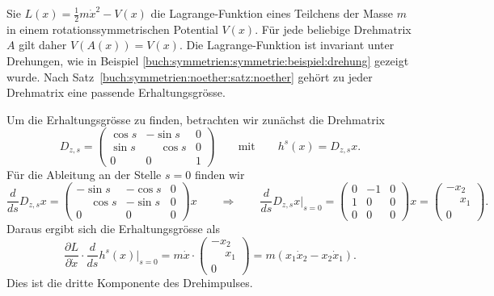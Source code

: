 \begin{beispiel}
\label{buch:symmetrien:noether:beispiel:drehimpuls}
Sie $L(x) = \frac12m\dot{x}^2 - V(x)$ die Lagrange-Funktion eines Teilchens
der Masse $m$ in einem rotationssymmetrischen Potential $V(x)$.
Für jede beliebige Drehmatrix $A$ gilt daher $V(A(x))=V(x)$.
Die Lagrange-Funktion ist invariant unter Drehungen, wie in Beispiel
\ref{buch:symmetrien:symmetrie:beispiel:drehung} gezeigt wurde.
Nach Satz~\ref{buch:symmetrien:noether:satz:noether} gehört zu jeder 
Drehmatrix eine passende Erhaltungsgrösse.

Um die Erhaltungsgrösse zu finden, betrachten wir zunächst die Drehmatrix
\[
D_{z,s}
=
\begin{pmatrix}
\cos s &          - \sin s & 0 \\
\sin s & \phantom{-}\cos s & 0 \\
   0   &            0      & 1
\end{pmatrix}
\qquad\text{mit}\qquad
h^s(x)
=
D_{z,s}x.
\]
Für die Ableitung an der Stelle $s=0$ finden wir
\[
\frac{d}{ds} D_{z,s}x
=
\begin{pmatrix}
          -\sin s & -\cos s & 0 \\
\phantom{-}\cos s & -\sin s & 0 \\
        0         &    0    & 0
\end{pmatrix}
x
\qquad\Rightarrow\qquad
\frac{d}{ds} D_{z,s}x
\bigg|_{s=0}
=
\begin{pmatrix}
 0 & -1 & 0 \\
 1 &  0 & 0 \\
 0 &  0 & 0
\end{pmatrix}
x
=
\begin{pmatrix}
-x_2\\
\phantom{-}x_1\\
0
\end{pmatrix}.
\]
Daraus ergibt sich die Erhaltungsgrösse als
\[
\frac{\partial L}{\partial\dot{x}}
\cdot
\frac{d}{ds}h^s(x)\bigg|_{s=0}
=
m\dot{x}\cdot
\begin{pmatrix}
-x_2\\
\phantom{-}x_1\\
0
\end{pmatrix}
=
m(x_1\dot{x}_2 - x_2\dot{x}_1).
\]
Dies ist die dritte Komponente des Drehimpulses.


\end{beispiel}
